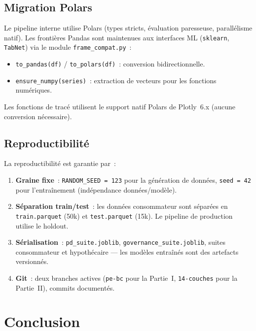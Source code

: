 \documentclass[12pt, a4paper, twoside, openright]{report}
\theoremstyle{definition}
\begin{document}
\section{Migration Polars}
\label{sec:archi-polars}

Le pipeline interne utilise Polars (types stricts, évaluation paresseuse, parallélisme natif). Les frontières Pandas sont maintenues aux interfaces ML (\texttt{sklearn}, \texttt{TabNet}) via le module \texttt{frame\_compat.py}~:

\begin{itemize}
\item \texttt{to\_pandas(df)} / \texttt{to\_polars(df)}~: conversion bidirectionnelle.
\item \texttt{ensure\_numpy(series)}~: extraction de vecteurs pour les fonctions numériques.
\end{itemize}

Les fonctions de tracé utilisent le support natif Polars de Plotly~6.x (aucune conversion nécessaire).

\section{Reproductibilité}
\label{sec:archi-repro}

La reproductibilité est garantie par~:

\begin{enumerate}
\item \textbf{Graine fixe}~: \texttt{RANDOM\_SEED = 123} pour la génération de données, \texttt{seed = 42} pour l'entraînement (indépendance données/modèle).
\item \textbf{Séparation train/test}~: les données consommateur sont séparées en \texttt{train.parquet} (50k) et \texttt{test.parquet} (15k). Le pipeline de production utilise le holdout.
\item \textbf{Sérialisation}~: \texttt{pd\_suite.joblib}, \texttt{governance\_suite.joblib}, suites consommateur et hypothécaire --- les modèles entraînés sont des artefacts versionnés.
\item \textbf{Git}~: deux branches actives (\texttt{pe-bc} pour la Partie~I, \texttt{14-couches} pour la Partie~II), commits documentés.
\end{enumerate}


\chapter*{Conclusion}
\label{chap:conclusion}
\end{document}
